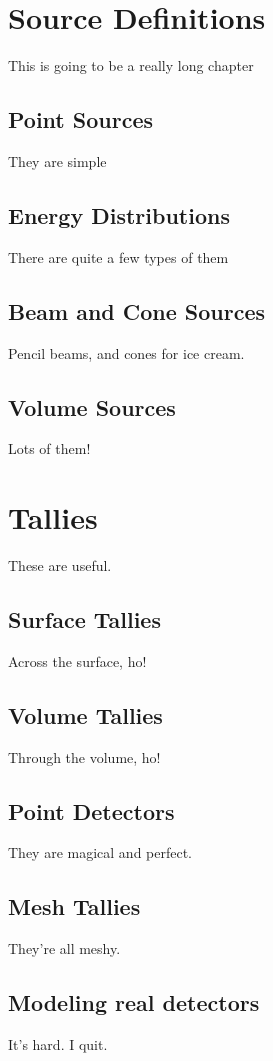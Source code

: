 \documentclass[10pt,a4paper]{book}
\begin{document}
\chapter{Source Definitions}
This is going to be a really long chapter

\section{Point Sources}
They are simple

\section{Energy Distributions}
There are quite a few types of them

\section{Beam and Cone Sources}
Pencil beams, and cones for ice cream.

\section{Volume Sources}
Lots of them!

\chapter{Tallies}
These are useful.

\section{Surface Tallies}
Across the surface, ho!

\section{Volume Tallies}
Through the volume, ho!

\section{Point Detectors}
They are magical and perfect.

\section{Mesh Tallies}
They're all meshy.

\section{Modeling real detectors}
It's hard. I quit.
\end{document}
